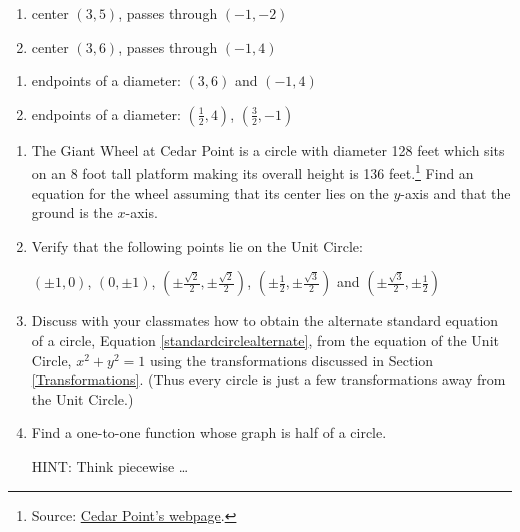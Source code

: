 \begin{multicols}{2}
\begin{enumerate}
\setcounter{enumi}{\value{HW}}

\item center $(3, 5)$,  passes through $(-1, -2)$ \label{buildcirclefirst}

\item  center $(3, 6)$,  passes through  $(-1, 4)$

\setcounter{HW}{\value{enumi}}
\end{enumerate}
\end{multicols}

\begin{multicols}{2}
\begin{enumerate}
\setcounter{enumi}{\value{HW}}

\item  endpoints of a diameter: $(3,6)$ and $(-1,4)$

\item endpoints of a diameter:  $\left( \frac{1}{2}, 4\right)$, $\left(\frac{3}{2}, -1\right)$  \label{buildcirclelast}

\setcounter{HW}{\value{enumi}}
\end{enumerate}
\end{multicols}


\begin{enumerate}
\setcounter{enumi}{\value{HW}}

\item The Giant Wheel at Cedar Point is a circle with diameter 128 feet which sits on an 8 foot tall platform making its overall height is 136 feet.\footnote{Source: \href{http://www.cedarpoint.com/public/park/rides/tranquil/giant_wheel.cfm}{\underline{Cedar Point's webpage}}.}  Find an equation for the wheel assuming that its center lies on the $y$-axis and that the ground is the $x$-axis.
\label{giantwheelcircle}

\item Verify that the following points lie on the Unit Circle:

 $(\pm 1, 0)$, $(0, \pm 1)$, $\left(\pm \frac{\sqrt{2}}{2}, \pm \frac{\sqrt{2}}{2}\right)$, $\left(\pm \frac{1}{2}, \pm \frac{\sqrt{3}}{2}\right)$ and  $\left(\pm \frac{\sqrt{3}}{2}, \pm \frac{1}{2}\right)$


\item \label{circletransunitcircleexercise} Discuss with your classmates how to obtain the alternate standard equation of a circle, Equation \ref{standardcirclealternate}, from the equation of the Unit Circle, $x^2+y^2=1$ using the transformations discussed in Section \ref{Transformations}.  (Thus every circle is just a few transformations away from the Unit Circle.)

\item Find a one-to-one function whose graph is half of a circle. 

HINT:  Think piecewise \ldots

\end{enumerate}

